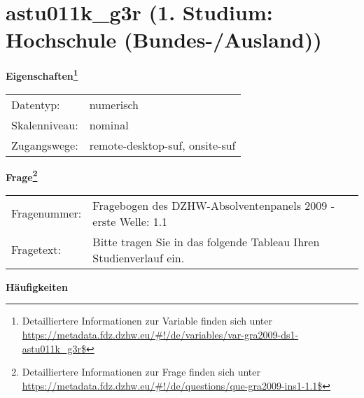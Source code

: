 
    \setcounter{footnote}{0}

    \vspace*{-1.8cm}
	\section{astu011k\_g3r (1. Studium: Hochschule (Bundes-/Ausland))}
	\label{section:astu011k_g3r}



    \vspace*{0.5cm}
    \noindent\textbf{Eigenschaften\footnote{Detailliertere Informationen zur Variable finden sich unter
		\url{https://metadata.fdz.dzhw.eu/\#!/de/variables/var-gra2009-ds1-astu011k_g3r$}}}\\
	\begin{tabularx}{\hsize}{@{}lX}
	Datentyp: & numerisch \\
	Skalenniveau: & nominal \\
	Zugangswege: &
	  remote-desktop-suf, 
	  onsite-suf
 \\
    \end{tabularx}



				\vspace*{0.5cm}
                \noindent\textbf{Frage\footnote{Detailliertere Informationen zur Frage finden sich unter
		              \url{https://metadata.fdz.dzhw.eu/\#!/de/questions/que-gra2009-ins1-1.1$}}}\\
				\begin{tabularx}{\hsize}{@{}lX}
					Fragenummer: &
					  Fragebogen des DZHW-Absolventenpanels 2009 - erste Welle:
					  1.1
 \\
					Fragetext: & Bitte tragen Sie in das folgende Tableau Ihren Studienverlauf ein. \\
				\end{tabularx}





        		\vspace*{0.5cm}
                \noindent\textbf{Häufigkeiten}

